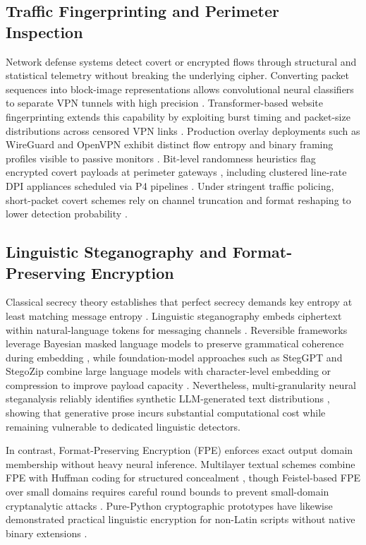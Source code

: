 \documentclass[conference]{IEEEtran}
\begin{document}
\subsection{Traffic Fingerprinting and Perimeter Inspection}
Network defense systems detect covert or encrypted flows through structural and statistical telemetry without breaking the underlying cipher. Converting packet sequences into block-image representations allows convolutional neural classifiers to separate VPN tunnels with high precision \cite{sun2022deep}. Transformer-based website fingerprinting extends this capability by exploiting burst timing and packet-size distributions across censored VPN links \cite{alazzam2026advanced}. Production overlay deployments such as WireGuard and OpenVPN exhibit distinct flow entropy and binary framing profiles visible to passive monitors \cite{gentile2024overlay, anyam2025empirical}. Bit-level randomness heuristics flag encrypted covert payloads at perimeter gateways \cite{mohd2026covertchannel}, including clustered line-rate DPI appliances scheduled via P4 pipelines \cite{jiang2021a}. Under stringent traffic policing, short-packet covert schemes rely on channel truncation and format reshaping to lower detection probability \cite{lu2023channel}.

\subsection{Linguistic Steganography and Format-Preserving Encryption}
Classical secrecy theory establishes that perfect secrecy demands key entropy at least matching message entropy \cite{shannon1949communication}. Linguistic steganography embeds ciphertext within natural-language tokens for messaging channels \cite{serret2022linguistic}. Reversible frameworks leverage Bayesian masked language models to preserve grammatical coherence during embedding \cite{chang2023reversible}, while foundation-model approaches such as StegGPT and StegoZip combine large language models with character-level embedding or compression to improve payload capacity \cite{adeeb2025steggpt, jiang2025stegozip}. Nevertheless, multi-granularity neural steganalysis reliably identifies synthetic LLM-generated text distributions \cite{wang2025multiclassification}, showing that generative prose incurs substantial computational cost while remaining vulnerable to dedicated linguistic detectors.

In contrast, Format-Preserving Encryption (FPE) enforces exact output domain membership without heavy neural inference. Multilayer textual schemes combine FPE with Huffman coding for structured concealment \cite{majeed2022new}, though Feistel-based FPE over small domains requires careful round bounds to prevent small-domain cryptanalytic attacks \cite{roh2026security}. Pure-Python cryptographic prototypes have likewise demonstrated practical linguistic encryption for non-Latin scripts without native binary extensions \cite{prabu2023implementation}.
\end{document}
